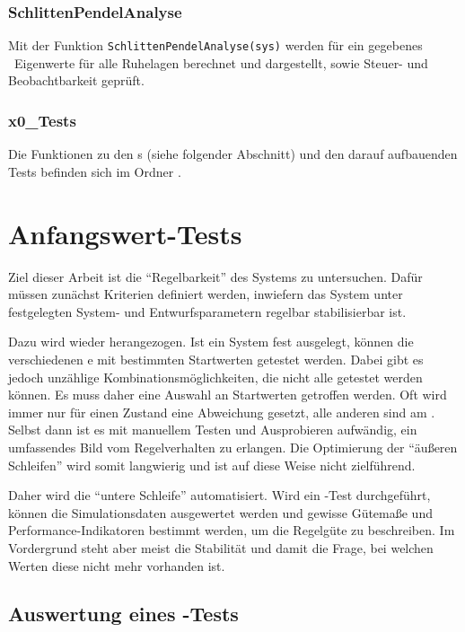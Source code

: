 \subsubsection{SchlittenPendelAnalyse}

Mit der Funktion \texttt{SchlittenPendelAnalyse(sys)} werden für ein gegebenes \zrm\ Eigenwerte für alle Ruhelagen berechnet und dargestellt, sowie Steuer- und Beobachtbarkeit geprüft.

\subsubsection{x0\_Tests}
Die Funktionen zu den \xots s (siehe folgender Abschnitt) und den darauf aufbauenden Tests befinden sich im Ordner .




\section{Anfangswert-Tests}\label{sec:x0test}

Ziel dieser Arbeit ist die "`Regelbarkeit"' des Systems zu untersuchen.
Dafür müssen zunächst Kriterien definiert werden, inwiefern das System unter festgelegten System- und Entwurfsparametern regelbar \bzw stabilisierbar ist.

Dazu wird wieder  herangezogen.
Ist ein System fest ausgelegt, können die verschiedenen \ap e mit bestimmten Startwerten getestet werden.
Dabei gibt es jedoch unzählige Kombinationsmöglichkeiten, die nicht alle getestet werden können.
Es muss daher eine Auswahl an Startwerten getroffen werden.
Oft wird immer nur für einen Zustand eine Abweichung gesetzt, alle anderen sind am \ap.
Selbst dann ist es mit manuellem Testen und Ausprobieren aufwändig, ein umfassendes Bild vom Regelverhalten zu erlangen.
Die Optimierung der "`äußeren Schleifen"' wird somit langwierig und ist auf diese Weise nicht zielführend.

Daher wird die "`untere Schleife"' automatisiert.
Wird ein \ap-Test durchgeführt, können die Simulationsdaten ausgewertet werden und gewisse Gütemaße und Performance-Indikatoren bestimmt werden, um die Regelgüte zu beschreiben.
Im Vordergrund steht aber meist die Stabilität und damit die Frage, bei welchen Werten diese nicht mehr vorhanden ist.


\subsection{Auswertung eines \ap-Tests}\label{subsec:x0ausw}

